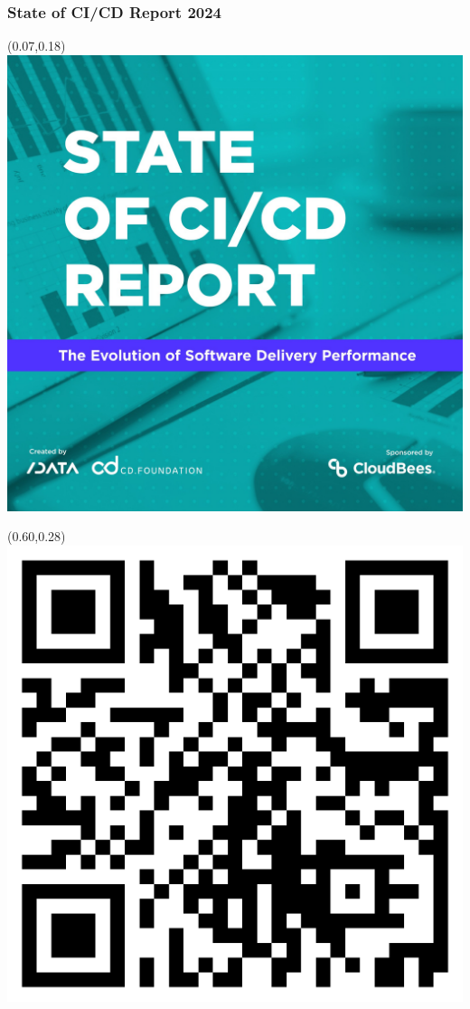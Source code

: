 \documentclass[aspectratio=169,11pt,hyperref={colorlinks=true}]{beamer}
\begin{document}
\begin{blackframe}
  \frametitle{State of CI/CD Report 2024}
  \begin{textblock*}{0.4\paperwidth}(0.07\paperwidth,0.18\paperheight)
    \includegraphics[width=0.4\paperwidth]{img/State of CICD Report square shorthand.jpg}
  \end{textblock*}
  \begin{textblock*}{0.27\paperwidth}(0.60\paperwidth,0.28\paperheight)
    \includegraphics[width=0.27\paperwidth]{img/state-ci-cd-2024-qr.png}
  \end{textblock*}
\end{blackframe}
\end{document}
